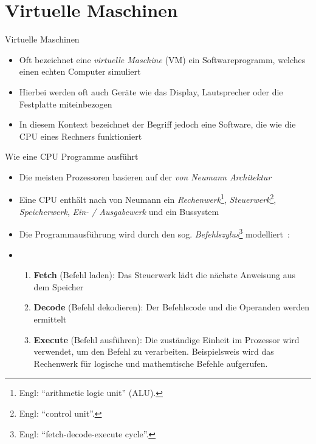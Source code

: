 \section{Virtuelle Maschinen}

\begin{frame}{Virtuelle Maschinen}
	\begin{itemize}
		\item Oft bezeichnet eine \emph{virtuelle Maschine} (VM) ein Softwareprogramm, welches einen echten Computer simuliert
		\item Hierbei werden oft auch Geräte wie das Display, Lautsprecher oder die Festplatte miteinbezogen
		\item In diesem Kontext bezeichnet der Begriff jedoch eine Software, die wie die CPU eines Rechners funktioniert
	\end{itemize}
\end{frame}

\begin{frame}{Wie eine CPU Programme ausführt}
	\begin{itemize}
		\item Die meisten Prozessoren basieren auf der \emph{von Neumann Architektur}~
		\item Eine CPU enthält nach von Neumann ein \emph{Rechenwerk}\footnote{Engl: \enquote{arithmetic logic unit} (ALU).}, \emph{Steuerwerk}\footnote{Engl: \enquote{control unit}.}, \emph{Speicherwerk}, \emph{Ein- / Ausgabewerk} und ein Bussystem~
		\item Die Programmausführung wird durch den sog. \emph{Befehlszylus}\footnote{Engl: \enquote{fetch-decode-execute cycle}.} modelliert~:
		\item[] \begin{enumerate}
				\item \textbf{Fetch} (Befehl laden): Das Steuerwerk lädt die nächste Anweisung aus dem Speicher
				\item \textbf{Decode} (Befehl dekodieren): Der Befehlscode und die Operanden werden ermittelt
				\item \textbf{Execute} (Befehl ausführen): Die zuständige Einheit im Prozessor wird verwendet, um den Befehl zu verarbeiten.
				      Beispielsweis wird das Rechenwerk für logische und mathemtische Befehle aufgerufen.
			\end{enumerate}
	\end{itemize}
\end{frame}

